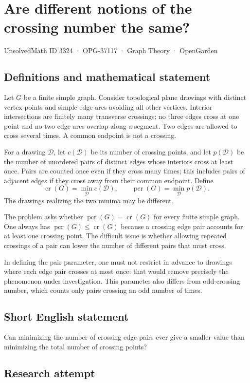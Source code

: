 \documentclass[11pt,a4paper]{article}
\begin{document}
\section*{Are different notions of the crossing number the same?}\label{3324}
{\small UnsolvedMath ID 3324 · OPG-37117 · Graph Theory · OpenGarden}
\subsection{Definitions and mathematical statement}
Let $G$ be a finite simple graph. Consider topological plane drawings
with distinct vertex points and simple edge arcs avoiding all other
vertices. Interior intersections are finitely many transverse
crossings; no three edges cross at one point and no two edge arcs
overlap along a segment. Two edges are allowed to cross several
times. A common endpoint is not a crossing.

For a drawing $\mathcal D$, let $c(\mathcal D)$ be its number of
crossing points, and let $p(\mathcal D)$ be the number of unordered
pairs of distinct edges whose interiors cross at least once. Pairs
are counted once even if they cross many times; this includes pairs
of adjacent edges if they cross away from their common endpoint.
Define
\[
 \operatorname{cr}(G)=\min_{\mathcal D}c(\mathcal D),
 \qquad
 \operatorname{pcr}(G)=\min_{\mathcal D}p(\mathcal D).
\]
The drawings realizing the two minima may be different.

The problem asks whether $\operatorname{pcr}(G)=\operatorname{cr}(G)$
for every finite simple graph. One always has
$\operatorname{pcr}(G)\le\operatorname{cr}(G)$ because a crossing edge
pair accounts for at least one crossing point. The difficult issue
is whether allowing repeated crossings of a pair can lower the
number of different pairs that must cross.

In defining the pair parameter, one must not restrict in advance
to drawings where each edge pair crosses at most once: that would
remove precisely the phenomenon under investigation. This parameter
also differs from odd-crossing number, which counts only pairs
crossing an odd number of times.
\subsection{Short English statement}
Can minimizing the number of crossing edge pairs ever give a smaller value than minimizing the total number of crossing points?
\subsection{Research attempt}
\end{document}
